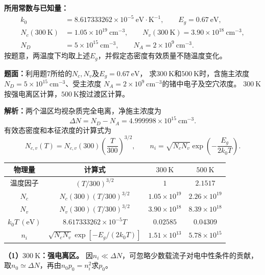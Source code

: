 \begin{problem}
    \textbf{所用常数与已知量：}
    \[
    \begin{aligned}
        k_0&=8.617333262\times10^{-5}\ \mathrm{eV\cdot K^{-1}},
        \qquad E_g=0.67\ \mathrm{eV},\\
        N_c(300\ \mathrm{K})&=1.05\times10^{19}\ \mathrm{cm}^{-3},
        \qquad N_v(300\ \mathrm{K})=3.90\times10^{18}\ \mathrm{cm}^{-3},\\
        N_D&=5\times10^{15}\ \mathrm{cm}^{-3},
        \qquad N_A=2\times10^9\ \mathrm{cm}^{-3}.
    \end{aligned}
    \]
    按题意，两温度下均取上述$E_g$，并假定态密度有效质量不随温度变化。

    \textbf{题面：}利用题7所给的$N_c,N_v$及$E_g=0.67\ \mathrm{eV}$，
    求$300\ \mathrm{K}$和$500\ \mathrm{K}$时，含施主浓度
    $N_D=5\times10^{15}\ \mathrm{cm}^{-3}$、受主浓度
    $N_A=2\times10^9\ \mathrm{cm}^{-3}$的锗中电子及空穴浓度。
    $300\ \mathrm{K}$按强电离区计算，$500\ \mathrm{K}$按过渡区计算。

    \textbf{解析：}两个温区均视杂质完全电离，净施主浓度为
    \[
    \Delta N=N_D-N_A=4.999998\times10^{15}\ \mathrm{cm}^{-3}.
    \]
    有效态密度和本征浓度的计算式为
    \[
    N_{c,v}(T)=N_{c,v}(300)\left(\frac{T}{300}\right)^{3/2},
    \qquad n_i=\sqrt{N_cN_v}\exp\!\left(-\frac{E_g}{2k_0T}\right).
    \]
    \begin{center}
        \small
        \begin{tabular}{c c c c}
            \hline
            物理量 & 计算式 & $300\ \mathrm{K}$ & $500\ \mathrm{K}$ \\
            \hline
            温度因子 & $(T/300)^{3/2}$ & $1$ & $2.1517$ \\
            $N_c$ & $N_c(300)(T/300)^{3/2}$ & $1.05\times10^{19}$ & $2.26\times10^{19}$ \\
            $N_v$ & $N_v(300)(T/300)^{3/2}$ & $3.90\times10^{18}$ & $8.39\times10^{18}$ \\
            $k_0T\ (\mathrm{eV})$ & $8.617333262\times10^{-5}T$ & $0.02585$ & $0.04309$ \\
            $n_i$ & $\sqrt{N_cN_v}\exp[-E_g/(2k_0T)]$ & $1.51\times10^{13}$ & $5.78\times10^{15}$ \\
            \hline
        \end{tabular}
    \end{center}

    \textbf{（1）$300\ \mathrm{K}$：强电离区。}
    因$n_i\ll\Delta N$，可忽略少数载流子对电中性条件的贡献，
    取$n_0\simeq\Delta N$，再由$n_0p_0=n_i^2$求$p_0$。


\end{problem}
